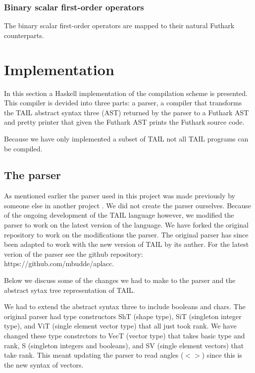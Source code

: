 \documentclass[11pt]{article}
\begin{document}
\subsubsection{Binary scalar first-order operators} 
The binary scalar first-order operators are mapped to their natural Futhark counterparts.

\section{Implementation}
\label{sec:impl}
In this section a Haskell implementation of the compilation scheme is presented. This compiler is devided into three parts: a parser, a compiler that transforms the TAIL abstract syntax three (AST) returned by the parser to a Futhark AST and pretty printer that given the Futhark AST prints the Futhark source code. 

Because we have only implemented a subset of TAIL not all TAIL programs can be compiled. 

\subsection{The parser}
\label{sec:parser}
As mentioned earlier the parser used in this project was made previously by someone else in another project \cite{APLACC}. We did not create the parser ourselves. 
Because of the ongoing development of the TAIL language however, we modified the parser to work on the latest version of the language. 
We have forked the original repository to work on the modifications the parser.
The original parser has since been adapted to work with the new version of TAIL by its auther. 
For the latest verion of the parser see the github repository: https://github.com/mbudde/aplacc. 

Below we discuss some of the changes we had to make to the parser and the abstract sytax tree representation of TAIL.

We had to extend the abstract syntax three to include booleans and chars. 
The original parser had type constructors ShT (shape type), SiT (singleton integer type), and ViT (single element vector type) that all just took rank.
We have changed these type constrctors to VecT (vector type) that takes basic type and rank, S (singleton integers and booleans), and SV (single element vectors) that take rank.
This meant updating the parser to read angles ($< >$) since this is the new syntax of vectors.
\end{document}
